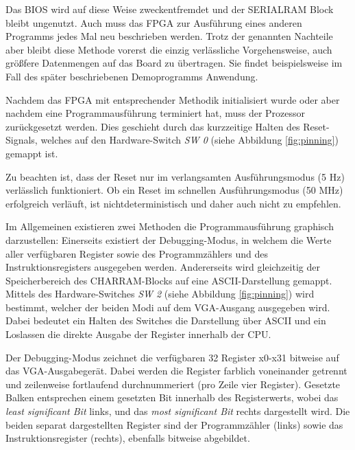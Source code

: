 Das BIOS wird auf diese Weise zweckentfremdet und der SERIALRAM Block bleibt ungenutzt. Auch muss das FPGA zur Ausf\"uhrung eines anderen Programms jedes Mal neu beschrieben werden. Trotz der genannten Nachteile aber bleibt diese Methode vorerst die einzig verl\"assliche Vorgehensweise, auch gr\"o\ss{}fere Datenmengen auf das Board zu \"ubertragen. Sie findet beispielsweise im Fall des sp\"ater beschriebenen Demoprogramms Anwendung.


Nachdem das FPGA mit entsprechender Methodik initialisiert wurde oder aber nachdem eine Programmausf\"uhrung terminiert hat, muss der Prozessor zur\"uckgesetzt werden. Dies geschieht durch das kurzzeitige Halten des Reset-Signals, welches auf den Hardware-Switch \textit{SW 0} (siehe Abbildung \ref{fig:pinning}) gemappt ist.

Zu beachten ist, dass der Reset nur im verlangsamten Ausf\"uhrungsmodus (5 Hz) verl\"asslich funktioniert. Ob ein Reset im schnellen Ausf\"uhrungsmodus (50 MHz) erfolgreich verl\"auft, ist nichtdeterministisch und daher auch nicht zu empfehlen.


Im Allgemeinen existieren zwei Methoden die Programmausf\"uhrung graphisch darzustellen: Einerseits existiert der Debugging-Modus, in welchem die Werte aller verf\"ugbaren Register sowie des Programmz\"ahlers und des Instruktionsregisters ausgegeben werden. Andererseits wird gleichzeitig der Speicherbereich des CHARRAM-Blocks auf eine ASCII-Darstellung gemappt. Mittels des Hardware-Switches \textit{SW 2} (siehe Abbildung \ref{fig:pinning}) wird bestimmt, welcher der beiden Modi auf dem VGA-Ausgang ausgegeben wird. Dabei bedeutet ein Halten des Switches die Darstellung \"uber ASCII und ein Loslassen die direkte Ausgabe der Register innerhalb der CPU.


Der Debugging-Modus zeichnet die verf\"ugbaren 32 Register x0-x31 bitweise auf das VGA-Ausgabeger\"at. Dabei werden die Register farblich voneinander getrennt und zeilenweise fortlaufend durchnummeriert (pro Zeile vier Register). Gesetzte Balken entsprechen einem gesetzten Bit innerhalb des Registerwerts, wobei das \textit{least significant Bit} links, und das \textit{most significant Bit} rechts dargestellt wird.
Die beiden separat dargestellten Register sind der Programmz\"ahler (links) sowie das Instruktionsregister (rechts), ebenfalls bitweise abgebildet.

